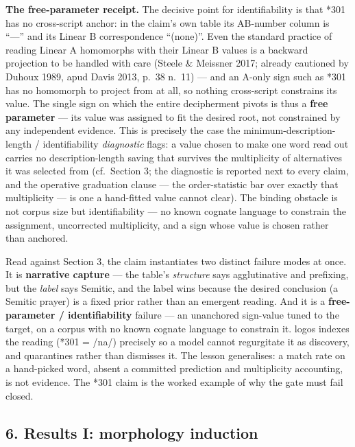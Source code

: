 \documentclass[
  10pt,
]{article}
\begin{document}
\textbf{The free-parameter receipt.} The decisive point for
identifiability is that *301 has no cross-script anchor: in the claim's
own table its AB-number column is ``---'' and its Linear B
correspondence ``(none)''. Even the standard practice of reading Linear
A homomorphs with their Linear B values is a backward projection to be
handled with care (Steele \& Meissner 2017; already cautioned by Duhoux
1989, apud Davis 2013, p.~38 n.~11) --- and an A-only sign such as *301
has no homomorph to project from at all, so nothing cross-script
constrains its value. The single sign on which the entire decipherment
pivots is thus a \textbf{free parameter} --- its value was assigned to
fit the desired root, not constrained by any independent evidence. This
is precisely the case the minimum-description-length / identifiability
\emph{diagnostic} flags: a value chosen to make one word read out
carries no description-length saving that survives the multiplicity of
alternatives it was selected from (cf.~Section 3; the diagnostic is
reported next to every claim, and the operative graduation clause ---
the order-statistic bar over exactly that multiplicity --- is one a
hand-fitted value cannot clear). The binding obstacle is not corpus size
but identifiability --- no known cognate language to constrain the
assignment, uncorrected multiplicity, and a sign whose value is chosen
rather than anchored.

Read against Section 3, the claim instantiates two distinct failure
modes at once. It is \textbf{narrative capture} --- the table's
\emph{structure} says agglutinative and prefixing, but the \emph{label}
says Semitic, and the label wins because the desired conclusion (a
Semitic prayer) is a fixed prior rather than an emergent reading. And it
is a \textbf{free-parameter / identifiability} failure --- an unanchored
sign-value tuned to the target, on a corpus with no known cognate
language to constrain it. logos indexes the reading (*301 = /na/)
precisely so a model cannot regurgitate it as discovery, and quarantines
rather than dismisses it. The lesson generalises: a match rate on a
hand-picked word, absent a committed prediction and multiplicity
accounting, is not evidence. The *301 claim is the worked example of why
the gate must fail closed.

\hypertarget{results-i-morphology-induction}{%
\subsection{6. Results I: morphology
induction}\label{results-i-morphology-induction}}
\end{document}
